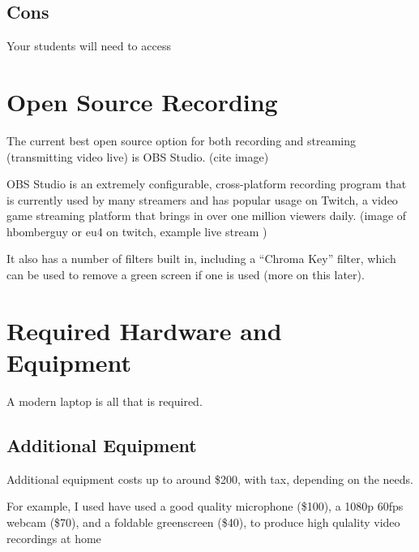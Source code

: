 \documentclass[sigconf]{acmart}
\begin{document}
\subsection{Cons}
Your students will need to access

\section{Open Source Recording}
The current best open source option for both recording and streaming (transmitting video live) is OBS Studio. (cite image)

OBS Studio is an extremely configurable, cross-platform recording program that is currently used by many streamers and has popular usage on Twitch, a video game streaming platform that brings in over one million viewers daily.  (image of hbomberguy or eu4 on twitch, example live stream )

It also has a number of filters built in, including a  ``Chroma Key'' filter, which can be used to remove a green screen if one is used (more on this later).



\section{Required Hardware and Equipment}
A modern laptop is all that is required.








\subsection{Additional Equipment}
Additional equipment costs up to around \$200, with tax, depending on the needs.

For example, I used have used a good quality microphone (\$100), a 1080p 60fps webcam (\$70), and a foldable greenscreen (\$40), to produce high qulality video recordings at home
\end{document}

